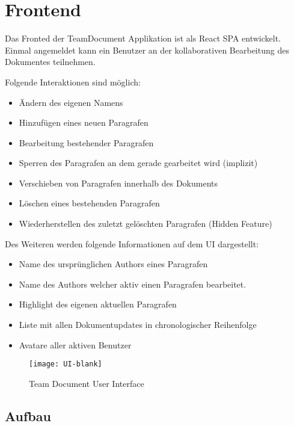 \section{Frontend}

Das Fronted der TeamDocument Applikation ist als React SPA entwickelt.
Einmal angemeldet kann ein Benutzer an der kollaborativen Bearbeitung des Dokumentes teilnehmen.

Folgende Interaktionen sind möglich:

\begin{itemize}
    \item Ändern des eigenen Namens
    \item Hinzufügen eines neuen Paragrafen
    \item Bearbeitung bestehender Paragrafen
    \item Sperren des Paragrafen an dem gerade gearbeitet wird (implizit)
    \item Verschieben von Paragrafen innerhalb des Dokuments
    \item Löschen eines bestehenden Paragrafen
    \item Wiederherstellen des zuletzt gelöschten Paragrafen (Hidden Feature)
\end{itemize}

Des Weiteren werden folgende Informationen auf dem UI dargestellt:

\begin{itemize}
    \item Name des ursprünglichen Authors eines Paragrafen
    \item Name des Authors welcher aktiv einen Paragrafen bearbeitet.
    \item Highlight des eigenen aktuellen Paragrafen
    \item Liste mit allen Dokumentupdates in chronologischer Reihenfolge
    \item Avatare aller aktiven Benutzer
\end{itemize}

\begin{figure}[H]
    \texttt{[image: UI-blank]}
    \caption{Team Document User Interface}
    \label{fig:Team Document User Interface}
\end{figure}


\subsection{Aufbau}

